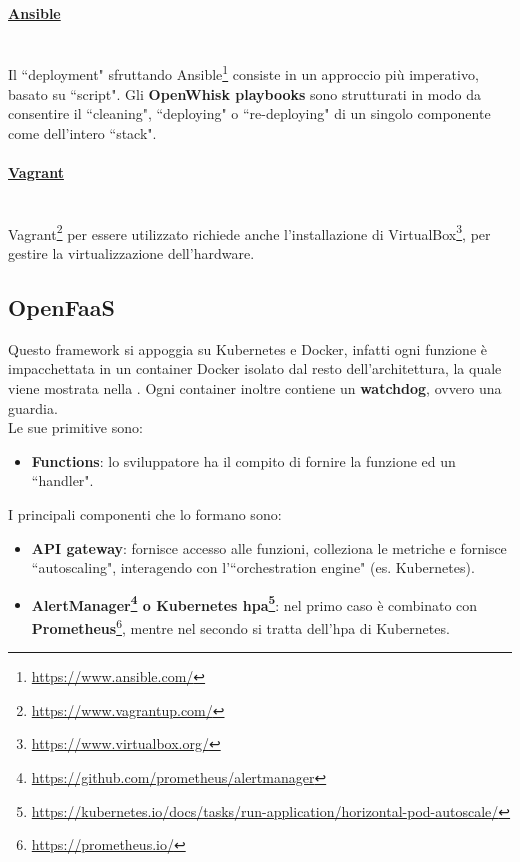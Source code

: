 \documentclass[12pt,a4paper,openany,twoside]{book}
\begin{document}
\paragraph{\underline{Ansible}} ~\\
Il ``deployment" sfruttando Ansible\footnote{\url{https://www.ansible.com/}} consiste in un approccio più imperativo, basato su ``script". Gli \textbf{OpenWhisk playbooks} sono strutturati in modo da consentire il ``cleaning", ``deploying" o ``re-deploying" di un singolo componente come dell'intero ``stack".

\paragraph{\underline{Vagrant}} ~\\
Vagrant\footnote{\url{https://www.vagrantup.com/}} per essere utilizzato richiede anche l'installazione di VirtualBox\footnote{\url{https://www.virtualbox.org/}}, per gestire la virtualizzazione dell'hardware.

\subsection{OpenFaaS}

Questo framework si appoggia su Kubernetes e Docker, infatti ogni funzione è impacchettata in un container Docker isolato dal resto dell'architettura, la quale viene mostrata nella . Ogni container inoltre contiene un \textbf{watchdog}, ovvero una guardia.
\\
Le sue primitive sono:
\begin{itemize}
    \item \textbf{Functions}: lo sviluppatore ha il compito di fornire la funzione ed un ``handler".
\end{itemize}

\noindent
I principali componenti che lo formano sono:
\begin{itemize}
    \item \textbf{API gateway}: fornisce accesso alle funzioni, colleziona le metriche e fornisce ``autoscaling", interagendo con l'``orchestration engine" (es. Kubernetes).
    \item \textbf{AlertManager\footnote{\url{https://github.com/prometheus/alertmanager}} o Kubernetes \ac{hpa}\footnote{\url{https://kubernetes.io/docs/tasks/run-application/horizontal-pod-autoscale/}}}: nel primo caso è combinato con \textbf{Prometheus}\footnote{\url{https://prometheus.io/}}, mentre nel secondo si tratta dell'\ac{hpa} di Kubernetes. 
\end{itemize}
\end{document}

